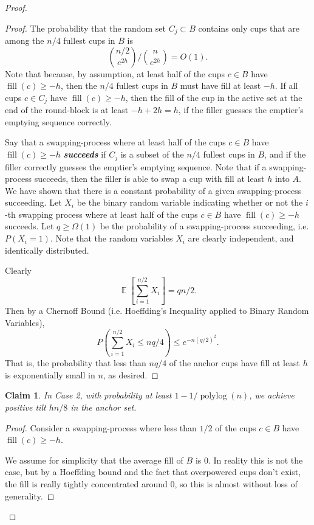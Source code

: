 \documentclass[twocolumn]{article}[10pt]
\newcommand{\defn}[1]{{\textit{\textbf{\boldmath #1}}}\xspace}
\DeclareMathOperator{\E}{\mathbb{E}}
\DeclareMathOperator{\polylog}{\text{polylog}}
\DeclareMathOperator{\fil}{\text{fill}}
\newtheorem{clm}{Claim}
\begin{document}
\begin{proof}
\begin{proof}
  The probability that the random set $C_j \subset B$ contains only cups that
  are among the $n/4$ fullest cups in $B$ is $${n/2 \choose e^{2h}} / {n
  \choose e^{2h}} = O(1).$$ Note that because, by assumption, at least half of
  the cups $c \in B$ have $\fil(c) \ge -h$, then the $n/4$ fullest cups in $B$
  must have fill at least $-h$. If all cups $ c\in C_j$ have $\fil(c) \ge -h$,
  then the fill of the cup in the active set at the end of the round-block is
  at least $-h + 2h = h$, if the filler guesses the emptier's emptying sequence
  correctly.

  Say that a swapping-process where at least half of the cups $c\in B$ have
  $\fil(c) \ge -h$ \defn{succeeds} if $C_j$ is a subset of the $n/4$ fullest cups
  in $B$, and if the filler correctly guesses the emptier's emptying sequence.
  Note that if a swapping-process succeeds, then the filler is able to swap a cup
  with fill at least $h$ into $A$. We have shown that there is a constant
  probability of a given swapping-process succeeding. Let $X_i$ be the binary
  random variable indicating whether or not the $i$-th swapping process where at
  least half of the cups $c\in B$ have $\fil(c) \ge -h$ succeeds. Let $q \ge
  \Omega(1)$ be the probability of a swapping-process succeeding, i.e.
  $P(X_i=1)$. Note that the random variables $X_i$ are clearly independent, and
  identically distributed.

  Clearly $$\E\left[\sum_{i=1}^{n/2} X_i\right] = qn/2.$$ Then by a Chernoff
  Bound (i.e. Hoeffding's Inequality applied to Binary Random Variables),
  $$P\left(\sum_{i=1}^{n/2} X_i\le nq/4\right) \le e^{-n(q/2)^2}.$$ That is, the
  probability that less than $nq/4$ of the anchor cups have fill at least $h$ is
  exponentially small in $n$, as desired.

\end{proof}

\begin{clm}
  \label{clm:xtreme}
  In Case 2, with probability at least $1- 1/\polylog(n)$, we achieve positive
  tilt $hn/8$ in the anchor set.
\end{clm}

\begin{proof}
  Consider a swapping-process where less than $1/2$ of the cups $c\in B$
  have $\fil(c) \ge -h$.


  We assume for simplicity that the average fill of $B$ is $0$. In reality this
  is not the case, but by a Hoeffding bound and the fact that overpowered cups
  don't exist, the fill is really tightly concentrated around $0$, so this is
  almost without loss of generality.


\end{proof}
\end{proof}
\end{document}
